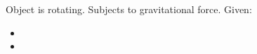 

Object is rotating. Subjects to gravitational force.
Given: 

\begin{itemize}
    \item 
    \item 
\end{itemize}
